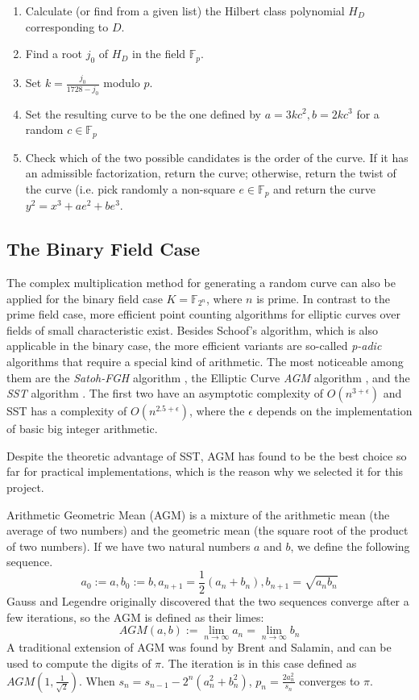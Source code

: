\documentclass[11pt,english]{article}
\begin{document}
\begin{enumerate}
 \item Calculate (or find from a given list) the Hilbert class polynomial $H_D$ corresponding to $D$.
 \item Find a root $j_0$ of $H_D$ in the field $\mathbb{F}_p$.
 \item Set $k=\frac{j_0}{1728-j_0}$ modulo $p$.
 \item Set the resulting curve to be the one defined by $a=3kc^2,b=2kc^3$ for a random $c\in\mathbb{F}_p$
 \item Check which of the two possible candidates is the order of the curve. If it has an admissible factorization, return the curve; otherwise,
	  return the twist of the curve (i.e. pick randomly a non-square $e\in\mathbb{F}_p$ and return the curve $y^2=x^3+ae^2+be^3$.
\end{enumerate}



\subsection{The Binary Field Case}
The complex multiplication method for generating a random curve can also be applied for the binary field case $K=\mathbb{F}_{2^n}$, where $n$ is prime.
In contrast to the prime field case, more efficient point counting algorithms for elliptic curves over fields of small characteristic exist.
Besides Schoof's algorithm, which is also applicable in the binary case, the more efficient variants are so-called \emph{p-adic} algorithms that require a special kind of arithmetic.
The most noticeable among them are the \emph{Satoh-FGH} algorithm \cite{satohfgh}, the Elliptic Curve \emph{AGM} algorithm \cite{717152}\cite{handbook}, and the \emph{SST} algorithm \cite{Satoh200389}.
The first two have an asymptotic complexity of $O(n^{3+\epsilon})$ and SST has a complexity of $O(n^{2.5+\epsilon})$, where the $\epsilon$ depends on the implementation of basic big integer arithmetic.

Despite the theoretic advantage of SST, AGM has found to be the best choice so far for practical implementations, which is the reason why we selected it for this project.

Arithmetic Geometric Mean (AGM) is a mixture of the arithmetic mean (the average of two numbers) and the geometric mean (the square root of the product of two numbers). If we have two natural numbers $a$ and $b$, we define the following sequence.
\begin{displaymath}
 a_0:=a,b_0:=b,a_{n+1}=\frac{1}{2}(a_n+b_n),b_{n+1}=\sqrt{a_nb_n}
\end{displaymath}
Gauss and Legendre originally discovered that the two sequences converge after a few iterations, so the AGM is defined as their limes:
\begin{displaymath}
 AGM(a,b):=\lim_{n\rightarrow \infty} a_n=\lim_{n\rightarrow \infty} b_n
\end{displaymath}
A traditional extension of AGM was found by Brent and Salamin, and can be used to compute the digits of $\pi$. The iteration is in this case defined as $AGM(1,\frac{1}{\sqrt{2}})$. When $s_n=s_{n-1}-2^n(a_n^2+b_n^2)$, $p_n=\frac{2a_n^2}{s_n}$ converges to $\pi$.
\end{document}
